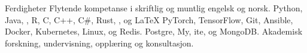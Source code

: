 
\begin{rubric}{Ferdigheter}
\entry*[Språk]
Flytende kompetanse i skriftlig og muntlig engelsk og norsk.
Python, Java, , R, C, C++, C\#, Rust, , og \LaTeX
{}
PyTorch, TensorFlow, Git, Ansible, Docker, Kubernetes, Linux, og Redis.
\entry*[Databaser]
Postgre, My, ite, og MongoDB.
\entry*[Diverse]
Akademisk forskning, undervisning, opplæring og konsultasjon.
\end{rubric}